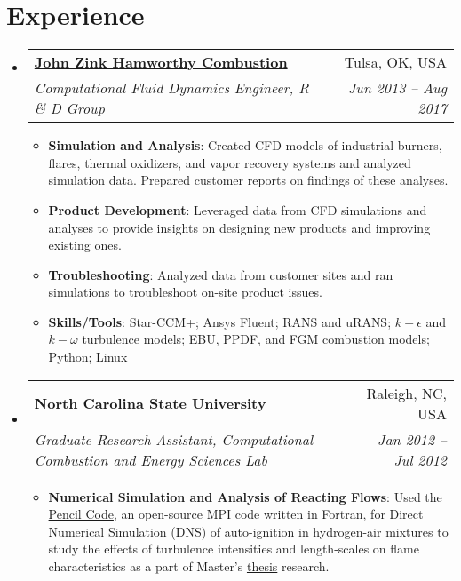 \documentclass[letterpaper,11pt]{article}
\makeatletter
\newcommand{\resumeItem}[2]{
	\item\small{
		\textbf{#1}{: #2 \vspace{-2pt}}
	}
}
\newcommand{\resumeSubheading}[4]{
	\vspace{-1pt}\item
	\begin{tabular*}{0.97\textwidth}[t]{l@{\extracolsep{\fill}}r}
		\textbf{#1} & #2 \\
		\textit{\small#3} & \textit{\small #4} \\
	\end{tabular*}\vspace{-5pt}
}
\newcommand{\resumeSubHeadingListStart}{\begin{itemize}[leftmargin=*]}
\newcommand{\resumeSubHeadingListEnd}{\end{itemize}}
\newcommand{\resumeItemListStart}{\begin{itemize}}
\newcommand{\resumeItemListEnd}{\end{itemize}\vspace{-5pt}}
\makeatother
\begin{document}
	\section{Experience}
	\resumeSubHeadingListStart
	
	\resumeSubheading
	{\href{https://www.johnzinkhamworthy.com/}{John Zink Hamworthy Combustion}}{Tulsa, OK, USA}
	{Computational Fluid Dynamics Engineer, R \& D Group}{Jun 2013 -- Aug 2017}
	\resumeItemListStart
	\resumeItem{Simulation and Analysis}
	{Created CFD models of industrial burners, flares, thermal oxidizers, and vapor recovery systems and analyzed simulation data. Prepared customer reports on findings of these analyses.}
	\resumeItem{Product Development}
	{Leveraged data from CFD simulations and analyses to provide insights on designing new products and improving existing ones.}
	\resumeItem{Troubleshooting}
	{Analyzed data from customer sites and ran simulations to troubleshoot on-site product issues.}
	\resumeItem{Skills/Tools}
	{Star-CCM+; Ansys Fluent; RANS and uRANS; $k-\epsilon$ and $k-\omega$ turbulence models; EBU, PPDF, and FGM combustion models; Python; Linux}
	\resumeItemListEnd
	
	\resumeSubheading
	{\href{https://www.mae.ncsu.edu/research/facilities-and-labs/}{North Carolina State University}}{Raleigh, NC, USA}
	{Graduate Research Assistant, Computational Combustion and Energy Sciences Lab}{Jan 2012 -- Jul 2012}
	\resumeItemListStart
	\resumeItem{Numerical Simulation and Analysis of Reacting Flows}
	{Used the \href{http://pencil-code.nordita.org/}{Pencil Code}, an open-source MPI code written in Fortran, for Direct Numerical Simulation (DNS) of auto-ignition in hydrogen-air mixtures to study the effects of turbulence intensities and length-scales on flame characteristics as a part of Master's \href{https://repository.lib.ncsu.edu/handle/1840.16/8193/}{thesis} research.}
	\resumeItemListEnd	
	\resumeSubHeadingListEnd
	
\end{document}
